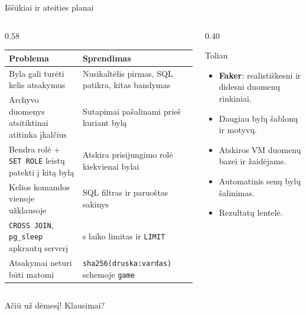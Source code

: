 \documentclass[hyperref={breaklinks=true},fleqn,mathserif]{beamer}
\begin{document}
\begin{frame}{Iššūkiai ir ateities planai}

\begin{columns}[T]
\begin{column}{0.58\textwidth}
\scriptsize
\begin{tabular}{@{}>{\raggedright\arraybackslash}p{}>{\raggedright\arraybackslash}p{}@{}}
\toprule
\textbf{Problema} & \textbf{Sprendimas} \\
\midrule
Byla gali turėti kelis atsakymus & Nusikaltėlis pirmas, SQL patikra, kitas bandymas \\ \addlinespace[3pt]
Archyvo duomenys atsitiktinai atitinka įkalčius & Sutapimai pašalinami prieš kuriant bylą \\ \addlinespace[3pt]
Bendra rolė + \texttt{SET ROLE} leistų patekti į kitą bylą & Atskira prisijungimo rolė kiekvienai bylai \\ \addlinespace[3pt]
Kelios komandos vienoje užklausoje & SQL filtras ir paruoštas sakinys \\ \addlinespace[3pt]
\texttt{CROSS JOIN}, \texttt{pg\_sleep} apkrautų serverį & 3 s laiko limitas ir \texttt{LIMIT} \\ \addlinespace[3pt]
Atsakymai neturi būti matomi & \texttt{sha256(druska:vardas)} schemoje \texttt{game} \\
\bottomrule
\end{tabular}
\end{column}

\begin{column}{0.40\textwidth}
\begin{block}{Toliau}
\footnotesize
\begin{itemize}
    \item \textbf{Faker}: realistiškesni ir didesni duomenų rinkiniai.
    \item Daugiau bylų šablonų ir motyvų.
    \item Atskiros VM duomenų bazei ir žaidėjams.
    \item Automatinis senų bylų šalinimas.
    \item Rezultatų lentelė.
\end{itemize}
\end{block}
\end{column}
\end{columns}

\vspace{3mm}
\begin{center}
\large Ačiū už dėmesį! Klausimai?
\end{center}

\end{frame}
\end{document}
